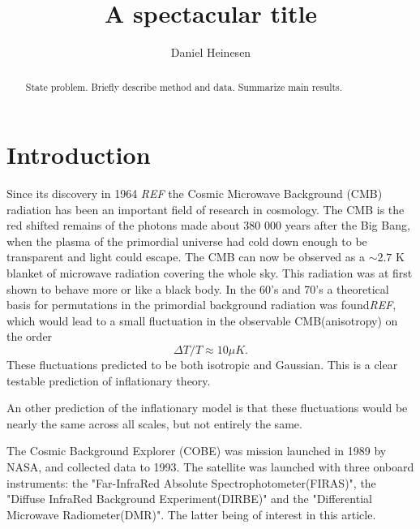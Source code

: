 \documentclass{emulateapj}
\begin{document}
\title{A spectacular title}

\author{Daniel Heinesen}





\begin{abstract}
  State problem. Briefly describe method and data. Summarize main results.
\end{abstract}

\section{Introduction}
\label{sec:introduction}

Since its discovery in 1964 \emph{REF} the Cosmic Microwave Background (CMB) radiation has been an important field of research in cosmology. The CMB is the red shifted remains of the photons made about 380 000 years after the Big Bang, when the plasma of the primordial universe had cold down enough to be transparent and light could escape. The CMB can now be observed as a $\sim 2.7$ K blanket of microwave radiation covering the whole sky. This radiation was at first shown to behave more or like a black body. In the 60's and 70's a theoretical basis for permutations in the primordial background radiation was found\emph{REF}, which would lead to a small fluctuation in the observable CMB(anisotropy) on the order
\begin{equation}
{\Delta T}/{T} \approx 10 \mu K.
\end{equation}
These fluctuations predicted to be both isotropic and Gaussian. This is a clear testable prediction of inflationary theory. 

An other prediction of the inflationary model is that these fluctuations would be nearly the same across all scales, but not entirely the same. 

The Cosmic Background Explorer (COBE) was mission launched in 1989 by NASA, and collected data to 1993. The satellite was launched with three onboard instruments: the "Far-InfraRed Absolute Spectrophotometer(FIRAS)", the "Diffuse InfraRed Background Experiment(DIRBE)" and the "Differential Microwave Radiometer(DMR)". The latter being of interest in this article.
\end{document}
